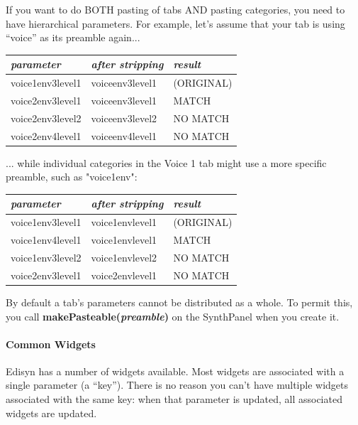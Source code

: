\documentclass{article}
\begin{document}
If you want to do BOTH pasting of tabs AND pasting categories,
you need to have hierarchical parameters.  For example, let's assume that your tab is using ``voice'' as its preamble again...

\begin{center}
\begin{tabular}{l@{\ \ \(\longrightarrow\)\ \ }ll}
	{\it parameter} & {\it after stripping} & {\it result}\\
	\hline
	voice1env3level1	&	voiceenv3level1& (ORIGINAL)\\
	voice2env3level1	&	voiceenv3level1&		MATCH\\
	voice2env3level2	&	voiceenv3level2&		NO MATCH\\
	voice2env4level1	&	voiceenv4level1&		NO MATCH\\
\end{tabular}
\end{center}

... while individual categories in the Voice 1 tab might use a more specific preamble, such as "voice1env":

\begin{center}
\begin{tabular}{l@{\ \ \(\longrightarrow\)\ \ }ll}
	{\it parameter} & {\it after stripping} & {\it result}\\
	\hline
	voice1env3level1	&	voice1envlevel1& (ORIGINAL)\\
	voice1env4level1	&	voice1envlevel1&		MATCH\\
	voice1env3level2	&	voice1envlevel2&		NO MATCH\\
	voice2env3level1	&	voice2envlevel1&		NO MATCH\\
\end{tabular}
\end{center}

By default a tab's parameters cannot be distributed as a whole.  To permit this, you call {\bf makePasteable(\textit{preamble})} on the SynthPanel when you create it.

\paragraph{Common Widgets}

Edisyn has a number of widgets available.  Most widgets are associated with a single parameter (a ``key'').  There is no reason you can't have multiple widgets associated with the same key: when that parameter is updated, all associated widgets are updated.
\end{document}
